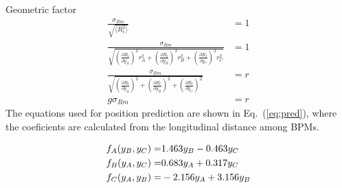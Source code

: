 \documentclass{beamer}
\begin{document}
\begin{frame}{Geometric factor}
\scriptsize
 \begin{align}
 \frac{\sigma_{Rm}}{\sqrt{\langle R_t^2\rangle}}&=1\\
 \frac{\sigma_{Rm}}{\sqrt{\left(\frac{\partial R_t}{\partial y_A}\right)^2r_A^2+\left(\frac{\partial R_t}{\partial y_B}\right)^2r_B^2+\left(\frac{\partial R_t}{\partial y_C}\right)^2r_C^2}}&=1\label{eq:allr}\\
 \frac{\sigma_{Rm}}{\sqrt{\left(\frac{\partial R_t}{\partial y_A}\right)^2+\left(\frac{\partial R_t}{\partial y_B}\right)^2+\left(\frac{\partial R_t}{\partial y_C}\right)^2}}&=r\label{eq:samer}\\
 g\sigma_{Rm}&=r
\end{align}
The equations used for position prediction are shown in Eq.~(\ref{eq:pred}), where the coeficients are calculated from the longitudinal distance among BPMs.\par
\begin{align}
 f_A(y_B,y_C)=&1.463y_B -0.463y_C\notag\\
 f_B(y_A,y_C)=&0.683y_A +0.317y_C\notag\\
 f_C(y_A,y_B)=&-2.156y_A +3.156y_B\label{eq:pred}
\end{align}
\end{frame}
\end{document}
